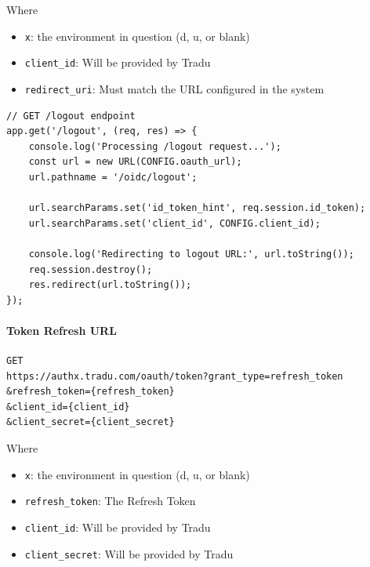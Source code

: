 \documentclass[11pt]{article}
\begin{document}
Where

\begin{itemize}
    \item \verb|x|: the environment in question (d, u, or blank)
    \item \verb|client_id|: Will be provided by Tradu
    \item \verb|redirect_uri|: Must match the URL configured in the system
\end{itemize}

\begin{codebox}
\begin{verbatim}
// GET /logout endpoint
app.get('/logout', (req, res) => {
    console.log('Processing /logout request...');
    const url = new URL(CONFIG.oauth_url);
    url.pathname = '/oidc/logout';

    url.searchParams.set('id_token_hint', req.session.id_token);
    url.searchParams.set('client_id', CONFIG.client_id);

    console.log('Redirecting to logout URL:', url.toString());
    req.session.destroy();
    res.redirect(url.toString());
});
\end{verbatim}
\end{codebox}

\paragraph{Token Refresh URL}
\begin{verbatim}
GET
https://authx.tradu.com/oauth/token?grant_type=refresh_token
&refresh_token={refresh_token}
&client_id={client_id}
&client_secret={client_secret}
\end{verbatim}

Where 

\begin{itemize}
    \item \verb|x|: the environment in question (d, u, or blank)
    \item \verb|refresh_token|: The Refresh Token
    \item \verb|client_id|: Will be provided by Tradu
    \item \verb|client_secret|: Will be provided by Tradu
\end{itemize}
\end{document}
